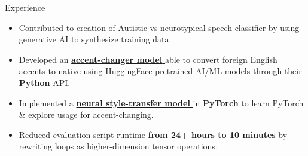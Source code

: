 \documentclass{resume} %
\begin{document}
\begin{workSection}{Experience}
	\experienceItem[
	company=UTEP,
	location=El Paso{,} TX,
	position=Undergraduate Research Assistant,
	duration=January 2024 - May 2024,
	]
	\begin{itemize}
		\vspace{-0.5em}
		\itemsep -6pt {}
		\item Contributed to creation of Autistic vs neurotypical speech classifier by using generative AI to synthesize training data.
		 \item Developed an \href{https://github.com/AshkanArabim/accent-change-paper-implementation}{\textbf{accent-changer model} \faExternalLink} able to convert foreign English accents to native using HuggingFace pretrained AI/ML models through their \textbf{Python} API.
		\item Implemented a \href{https://github.com/AshkanArabim/neural-style-transfer}{\textbf{neural style-transfer model} \faExternalLink} in \textbf{PyTorch} to learn PyTorch \& explore usage for accent-changing.
       \item Reduced evaluation script runtime \textbf{from 24+ hours to 10 minutes} by rewriting loops as higher-dimension tensor operations.
	\end{itemize}
	


\end{workSection}
\end{document}
